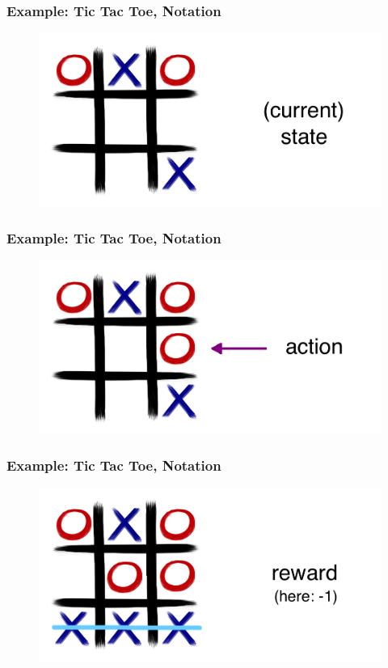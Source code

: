 \documentclass[handout]{beamer}
\begin{document}
\begin{frame}\frametitle{Example: Tic Tac Toe, Notation}\small
\vspace{4mm}

\begin{figure}
\includegraphics[width=0.75\linewidth]{Figures/tic1c}
\end{figure}
\vspace{5mm}
\end{frame}

\begin{frame}\frametitle{Example: Tic Tac Toe, Notation}\small
\vspace{4mm}

\begin{figure}
\includegraphics[width=0.75\linewidth]{Figures/tic1b}
\end{figure}
\vspace{5mm}
\end{frame}

\begin{frame}\frametitle{Example: Tic Tac Toe, Notation}\small
\vspace{4mm}

\begin{figure}
\includegraphics[width=0.75\linewidth]{Figures/tic1e}
\end{figure}
\vspace{5mm}
\end{frame}
\end{document}
